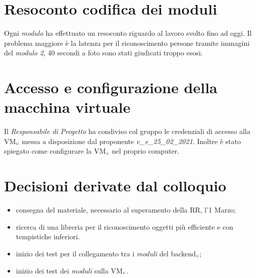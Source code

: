 \section{Resoconto codifica dei moduli}
Ogni \textit{modulo} ha effettuato un resoconto riguardo al lavoro svolto fino ad oggi.
Il problema maggiore è la latenza per il riconoscimento persone tramite immagini del \textit{modulo 2}, 40 secondi a foto sono stati giudicati troppo esosi.


\section{Accesso e configurazione della macchina virtuale}
Il \textit{Responsabile di Progetto} ha condiviso col gruppo le credenziali di accesso alla VM$_{\scaleto{G}{3pt}}$ messa a disposizione dal proponente \textit{v\_e\_25\_02\_2021}.
Inoltre è stato spiegato come configurare la VM$_{\scaleto{G}{3pt}}$ nel proprio computer.

\section{Decisioni derivate dal colloquio}
  \begin{itemize}
    \item consegna del materiale, necessario al superamento della RR, l'1 Marzo;
    \item ricerca di una libreria per il riconoscimento oggetti più efficiente e con tempistiche inferiori.
    \item inizio dei test per il collegamento tra i \textit{moduli} del backend$_{\scaleto{G}{3pt}}$;
    \item inizio dei test dei \textit{moduli} sulla VM$_{\scaleto{G}{3pt}}$.
  \end{itemize}
